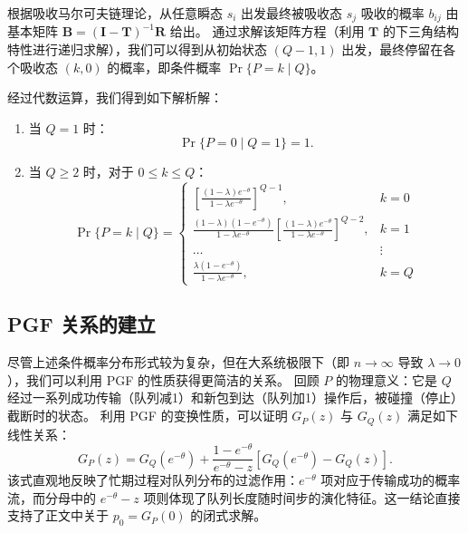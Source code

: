 根据吸收马尔可夫链理论，从任意瞬态 $s_i$ 出发最终被吸收态 $s_j$ 吸收的概率 $b_{ij}$ 由基本矩阵 $\mathbf{B} = (\mathbf{I} - \mathbf{T})^{-1} \mathbf{R}$ 给出。
通过求解该矩阵方程（利用 $\mathbf{T}$ 的下三角结构特性进行递归求解），我们可以得到从初始状态 $(Q-1, 1)$ 出发，最终停留在各个吸收态 $(k, 0)$ 的概率，即条件概率 $\Pr\{P=k \mid Q\}$。

经过代数运算，我们得到如下解析解：

\begin{enumerate}
	\item 当 $Q=1$ 时：
	\begin{equation}
		\Pr\{P=0 \mid Q=1\} = 1.
	\end{equation}
	
	\item 当 $Q \ge 2$ 时，对于 $0 \le k \le Q$：
	\begin{equation}
		\Pr\{P=k \mid Q\} = 
		\begin{cases}
			\left[ \frac{(1-\lambda)e^{-\theta}}{1-\lambda e^{-\theta}} \right]^{Q-1}, & k=0 \\
			\frac{(1-\lambda)(1-e^{-\theta})}{1-\lambda e^{-\theta}} \left[ \frac{(1-\lambda)e^{-\theta}}{1-\lambda e^{-\theta}} \right]^{Q-2}, & k=1 \\
			\dots & \vdots \\
			\frac{\lambda(1-e^{-\theta})}{1-\lambda e^{-\theta}}, & k=Q
		\end{cases}
	\end{equation}
\end{enumerate}

\subsection{PGF 关系的建立}

尽管上述条件概率分布形式较为复杂，但在大系统极限下（即 $n \to \infty$ 导致 $\lambda \to 0$），我们可以利用 PGF 的性质获得更简洁的关系。
回顾 $P$ 的物理意义：它是 $Q$ 经过一系列成功传输（队列减1）和新包到达（队列加1）操作后，被碰撞（停止）截断时的状态。
利用 PGF 的变换性质，可以证明 $G_P(z)$ 与 $G_Q(z)$ 满足如下线性关系：
\begin{equation}
	\label{eq:pgf_P_appendix}
	G_P(z) = G_Q(e^{-\theta}) + \frac{1 - e^{-\theta}}{e^{-\theta} - z} \left[ G_Q(e^{-\theta}) - G_Q(z) \right].
\end{equation}
该式直观地反映了忙期过程对队列分布的过滤作用：$e^{-\theta}$ 项对应于传输成功的概率流，而分母中的 $e^{-\theta}-z$ 项则体现了队列长度随时间步的演化特征。这一结论直接支持了正文中关于 $p_0 = G_P(0)$ 的闭式求解。
